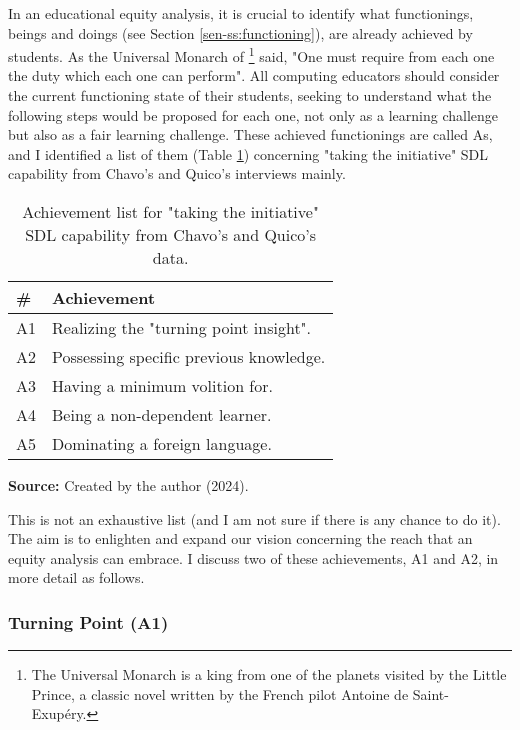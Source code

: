 In an educational equity analysis, it is crucial to identify what functionings, beings and doings (see Section \ref{sen-ss:functioning}), are already achieved by students. As the Universal Monarch of \footnote{The Universal Monarch is a king from one of the planets visited by the Little Prince, a classic novel written by the French pilot Antoine de Saint-Exupéry.} said, "One must require from each one the duty which each one can perform". All computing educators should consider the current functioning state of their students, seeking to understand what the following steps would be proposed for each one, not only as a learning challenge but also as a fair learning challenge. These achieved functionings are called \glspl{A}, and I identified a list of them (Table \ref{tbl:achievement-list}) concerning "taking the initiative" \gls{SDL} capability from Chavo's and Quico's interviews mainly. 

\begin{table}[ht]
\caption{Achievement list for "taking the initiative" \acrshort{SDL} capability from Chavo's and Quico's data.}
\label{tbl:achievement-list}
\centering
{}
\begin{tabular}{p{0.5cm}p{8.5cm}}
\hline
\textbf{\#} &
\textbf{Achievement}\\
\hline     
A1 &
Realizing the "turning point insight".\\
A2 & 
Possessing specific previous knowledge.\\
A3 &
Having a minimum volition for. \\
A4 &
Being a non-dependent learner. \\
A5 &
Dominating a foreign language. \\
\hline

\end{tabular}
\par\medskip\ABNTEXfontereduzida\selectfont\textbf{Source:} Created by the author (2024). \par\medskip
\end{table}

This is not an exhaustive list (and I am not sure if there is any chance to do it). The aim is to enlighten and expand our vision concerning the reach that an equity analysis can embrace. I discuss two of these achievements, \gls{A}1 and \gls{A}2, in more detail as follows.

\subsubsection{Turning Point (A1)}

